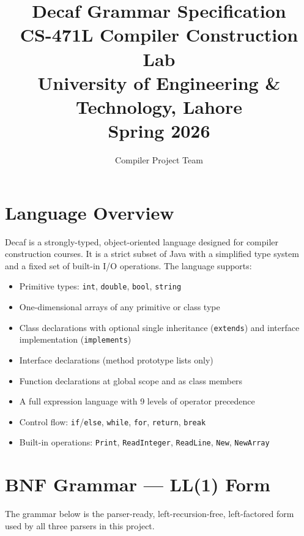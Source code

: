 \documentclass[12pt,a4paper]{article}
\title{\textbf{Decaf Grammar Specification}\\
       \large CS-471L Compiler Construction Lab\\
       University of Engineering \& Technology, Lahore\\
       Spring 2026}
\author{Compiler Project Team}
\date{}
\begin{document}
\maketitle
\tableofcontents
\newpage

\section{Language Overview}

Decaf is a strongly-typed, object-oriented language designed for compiler
construction courses. It is a strict subset of Java with a simplified type
system and a fixed set of built-in I/O operations. The language supports:

\begin{itemize}
  \item Primitive types: \texttt{int}, \texttt{double}, \texttt{bool},
        \texttt{string}
  \item One-dimensional arrays of any primitive or class type
  \item Class declarations with optional single inheritance
        (\texttt{extends}) and interface implementation (\texttt{implements})
  \item Interface declarations (method prototype lists only)
  \item Function declarations at global scope and as class members
  \item A full expression language with 9 levels of operator precedence
  \item Control flow: \texttt{if}/\texttt{else}, \texttt{while},
        \texttt{for}, \texttt{return}, \texttt{break}
  \item Built-in operations: \texttt{Print}, \texttt{ReadInteger},
        \texttt{ReadLine}, \texttt{New}, \texttt{NewArray}
\end{itemize}

\section{BNF Grammar --- LL(1) Form}

The grammar below is the parser-ready, left-recursion-free,
left-factored form used by all three parsers in this project.
\end{document}
